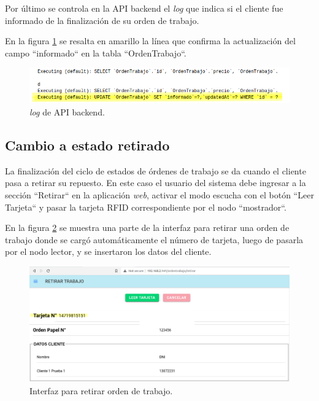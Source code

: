 Por último se controla en la API backend el \textit{log} que indica si el cliente fue informado de la finalización de su orden de trabajo.

En la figura \ref{fig:ensayomensajeapilog} se resalta en amarillo la línea que confirma la actualización del campo ``informado`` en la tabla ``OrdenTrabajo``.

\begin{figure}[H]
	\centering
	\includegraphics[width=\textwidth]{./Figures/ensayo-1/20.mensaje-api-log.png}
	\caption{\textit{log} de API backend.}
	\label{fig:ensayomensajeapilog}
\end{figure}


\subsection{Cambio a estado retirado}
\label{subsec:ensayoretiro}

La finalización del ciclo de estados de órdenes de trabajo se da cuando el cliente pasa a retirar su repuesto. En este caso el usuario del sistema debe ingresar a la sección ``Retirar`` en la aplicación \textit{web}, activar el modo escucha con el botón ``Leer Tarjeta`` y pasar la tarjeta RFID correspondiente por el nodo ``mostrador``.

En la figura \ref{fig:ensayoretirar-web-1} se muestra una parte de la interfaz para retirar una orden de trabajo donde se cargó automáticamente el número de tarjeta, luego de pasarla por el nodo lector, y se insertaron los datos del cliente.

\begin{figure}[H]
	\centering
	\includegraphics[width=\textwidth]{./Figures/ensayo-1/21.retirar-web-1.png}
	\caption{Interfaz para retirar orden de trabajo.}
	\label{fig:ensayoretirar-web-1}
\end{figure}

